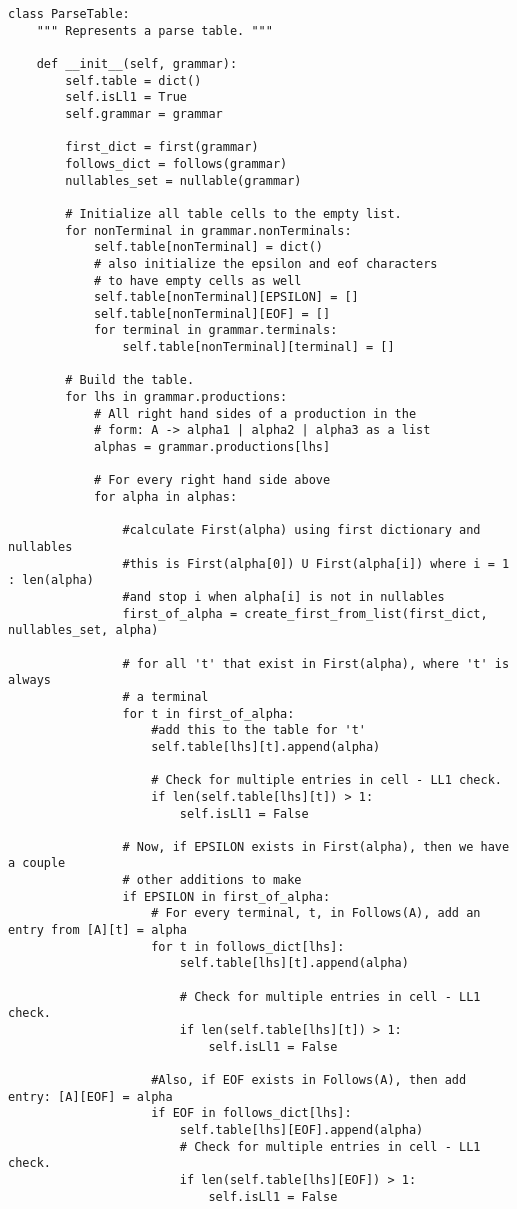 \documentclass{article}
\begin{document}
\begin{verbatim}
class ParseTable:
    """ Represents a parse table. """

    def __init__(self, grammar):
        self.table = dict()
        self.isLl1 = True
        self.grammar = grammar

        first_dict = first(grammar)
        follows_dict = follows(grammar)
        nullables_set = nullable(grammar)

        # Initialize all table cells to the empty list.
        for nonTerminal in grammar.nonTerminals:
            self.table[nonTerminal] = dict()
            # also initialize the epsilon and eof characters
            # to have empty cells as well
            self.table[nonTerminal][EPSILON] = []
            self.table[nonTerminal][EOF] = []
            for terminal in grammar.terminals:
                self.table[nonTerminal][terminal] = []

        # Build the table.
        for lhs in grammar.productions:
            # All right hand sides of a production in the
            # form: A -> alpha1 | alpha2 | alpha3 as a list
            alphas = grammar.productions[lhs]

            # For every right hand side above
            for alpha in alphas:

                #calculate First(alpha) using first dictionary and nullables
                #this is First(alpha[0]) U First(alpha[i]) where i = 1 : len(alpha)
                #and stop i when alpha[i] is not in nullables
                first_of_alpha = create_first_from_list(first_dict, nullables_set, alpha)

                # for all 't' that exist in First(alpha), where 't' is always
                # a terminal
                for t in first_of_alpha:
                    #add this to the table for 't'
                    self.table[lhs][t].append(alpha)

                    # Check for multiple entries in cell - LL1 check.
                    if len(self.table[lhs][t]) > 1:
                        self.isLl1 = False

                # Now, if EPSILON exists in First(alpha), then we have a couple
                # other additions to make
                if EPSILON in first_of_alpha:
                    # For every terminal, t, in Follows(A), add an entry from [A][t] = alpha
                    for t in follows_dict[lhs]:
                        self.table[lhs][t].append(alpha)

                        # Check for multiple entries in cell - LL1 check.
                        if len(self.table[lhs][t]) > 1:
                            self.isLl1 = False

                    #Also, if EOF exists in Follows(A), then add entry: [A][EOF] = alpha
                    if EOF in follows_dict[lhs]:
                        self.table[lhs][EOF].append(alpha)
                        # Check for multiple entries in cell - LL1 check.
                        if len(self.table[lhs][EOF]) > 1:
                            self.isLl1 = False
\end{verbatim}
\end{document}
